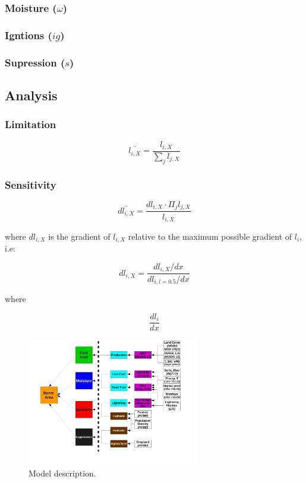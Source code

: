 \documentclass[12pt]{article}
\begin{document}
\subsubsection{Moisture ($\omega$)}

\subsubsection{Igntions ($ig$)}

\subsubsection{Supression ($s$)}

\subsection{Analysis}

\subsubsection{Limitation}

\begin{equation}
    \bar{l_{i, X}} = \frac{l_{i, X}}{\sum_{j} l_{j, X}}
\end{equation}

\subsubsection{Sensitivity}

\begin{equation}
    \bar{dl_{i, X}} = \frac{dl_{i, X} \cdot \Pi_{j} l_{j, X}}{l_{i, X}}
\end{equation}

where $dl_{i, X}$ is the gradient of $l_{i, X}$ relative to the maximum possible gradient of $l_{i}$, i.e:

\begin{equation}
    dl_{i, X} = \frac{dl_{i, X} / dx}{dl_{i, l = 0.5} / dx}
\end{equation}

where

\begin{equation}
    \frac{dl_{i}}{dx} 
\end{equation}


\begin{figure}[!ht]
  \centering
    \includegraphics[width=0.67\textwidth]{Model_schematic.pdf}
   
  \caption{Model description.}
\end{figure}
\end{document}
